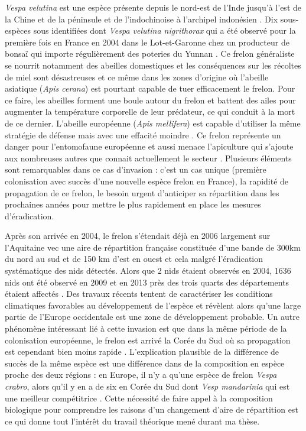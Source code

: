 \emph{Vespa velutina} est une espèce présente depuis le nord-est de
l'Inde jusqu'à l'est de la Chine et de la péninsule et de l'indochinoise
à l'archipel indonésien \citep{Villemant2006}. Dix sous-espèces sous
identifiées dont \emph{Vespa velutina nigrithorax} qui a été observé
pour la première fois en France en 2004 dans le Lot-et-Garonne chez un
producteur de bonsaï qui importe régulièrement des poteries du Yunnan
\citep{Villemant2006}. Ce frelon généraliste se nourrit notamment des
abeilles domestiques et les conséquences sur les récoltes de miel sont
désastreuses et ce même dans les zones d'origine où l'abeille asiatique
(\emph{Apis cerana}) est pourtant capable de tuer efficacement le
frelon. Pour ce faire, les abeilles forment une boule autour du frelon
et battent des ailes pour augmenter la température corporelle de leur
prédateur, ce qui conduit à la mort de ce dernier. L'abeille européenne
(\emph{Apis mellifera}) est capable d'utiliser la même stratégie de
défense mais avec une effacité moindre \citep{Villemant2006}. Ce frelon
représente un danger pour l'entomofaune européenne et aussi menace
l'apiculture qui s'ajoute aux nombreuses autres que connait actuellement
le secteur \citep{Vanbergen2013}. Plusieurs éléments sont remarquables
dans ce cas d'invasion : c'est un cas unique (première colonisation avec
succès d'une nouvelle espèce frelon en France), la rapidité de
propagation de ce frelon, le besoin urgent d'anticiper sa répartition
dans les prochaines années pour mettre le plus rapidement en place les
mesures d'éradication.

Après son arrivée en 2004, le frelon s'étendait déjà en 2006 largement
sur l'Aquitaine vec une aire de répartition française constituée d'une
bande de 300km du nord au sud et de 150 km d'est en ouest
\citep{Villemant2006} et cela malgré l'éradication systématique des nids
détectés. Alors que 2 nids étaient observés en 2004, 1636 nids ont été
observé en 2009 et en 2013 près des trois quarts des départements
étaient affectés \citep{Robinet2016}. Des travaux récents tentent de
caractériser les conditions climatiques favorables au développement de
l'espèce \citep{Villemant2011} et révèlent alors qu'une large partie de
l'Europe occidentale est une zone de développement probable. Un autre
phénomène intéressant lié à cette invasion est que dans la même période
de la colonisation européenne, le frelon est arrivé la Corée du Sud où
sa propagation est cependant bien moins rapide \citep{Villemant2011}.
L'explication plausible de la différence de succès de la même espèce est
une différence dans de la composition en espèce proche des deux régions
: en Europe, il n'y a qu'une espèce de frelon \emph{Vespa crabro}, alors
qu'il y en a de six en Corée du Sud dont \emph{Vesp mandarinia} qui est
une meilleur compétitrice \citep{Villemant2011}. Cette nécessité de
faire appel à la composition biologique pour comprendre les raisons d'un
changement d'aire de répartition est ce qui donne tout l'intérêt du
travail théorique mené durant ma thèse.


